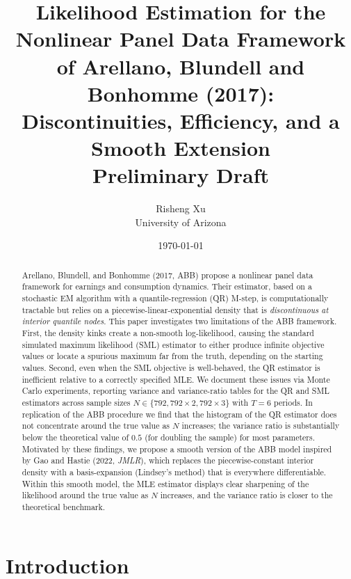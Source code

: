 \documentclass[12pt]{article}
\title{\textbf{Likelihood Estimation for the Nonlinear Panel Data Framework\\
of Arellano, Blundell and Bonhomme (2017):\\
Discontinuities, Efficiency, and a Smooth Extension}\\[0.6em]
\large Preliminary Draft}
\author{Risheng Xu\\
University of Arizona}
\date{\today}
\begin{document}
\maketitle

\begin{abstract}
\noindent
Arellano, Blundell, and Bonhomme (2017, ABB) propose a nonlinear panel data
framework for earnings and consumption dynamics.
Their estimator, based on a stochastic EM algorithm with a quantile-regression
(QR) M-step, is computationally tractable but relies on a piecewise-linear-exponential
density that is \emph{discontinuous at interior quantile nodes}.
This paper investigates two limitations of the ABB framework.
First, the density kinks create a non-smooth log-likelihood, causing
the standard simulated maximum likelihood (SML) estimator to either
produce infinite objective values or locate a spurious maximum far from
the truth, depending on the starting values.
Second, even when the SML objective is well-behaved, the QR estimator is
inefficient relative to a correctly specified MLE.
We document these issues via Monte Carlo experiments, reporting variance and
variance-ratio tables for the QR and SML estimators across sample sizes
$N\in\{792, 792\times2, 792\times3\}$ with $T=6$ periods.
In replication of the ABB procedure we find that the histogram of the QR
estimator does not concentrate around the true value as $N$ increases; the
variance ratio is substantially below the theoretical value of $0.5$ (for
doubling the sample) for most parameters.
Motivated by these findings, we propose a smooth version of the ABB model
inspired by Gao and Hastie (2022, \textit{JMLR}), which replaces the
piecewise-constant interior density with a basis-expansion (Lindsey's method)
that is everywhere differentiable.
Within this smooth model, the MLE estimator displays clear sharpening of the
likelihood around the true value as $N$ increases, and the variance ratio is
closer to the theoretical benchmark.
\end{abstract}

\newpage
\tableofcontents
\newpage

\section{Introduction}
\label{sec:intro}
\end{document}
